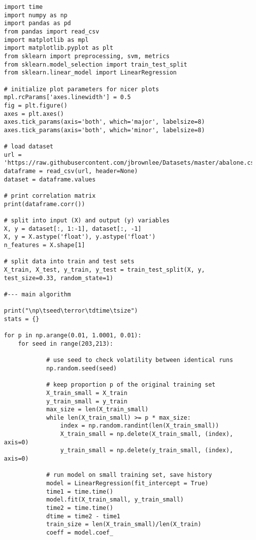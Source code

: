 \documentclass[oneside,10pt]{book}
\begin{document}
\begin{lstlisting}
import time
import numpy as np
import pandas as pd
from pandas import read_csv
import matplotlib as mpl
import matplotlib.pyplot as plt
from sklearn import preprocessing, svm, metrics
from sklearn.model_selection import train_test_split
from sklearn.linear_model import LinearRegression

# initialize plot parameters for nicer plots
mpl.rcParams['axes.linewidth'] = 0.5
fig = plt.figure()
axes = plt.axes()
axes.tick_params(axis='both', which='major', labelsize=8)
axes.tick_params(axis='both', which='minor', labelsize=8)

# load dataset
url = 'https://raw.githubusercontent.com/jbrownlee/Datasets/master/abalone.csv'
dataframe = read_csv(url, header=None)
dataset = dataframe.values

# print correlation matrix
print(dataframe.corr())

# split into input (X) and output (y) variables
X, y = dataset[:, 1:-1], dataset[:, -1]
X, y = X.astype('float'), y.astype('float')
n_features = X.shape[1]

# split data into train and test sets
X_train, X_test, y_train, y_test = train_test_split(X, y, test_size=0.33, random_state=1)

#--- main algorithm

print("\np\tseed\terror\tdtime\tsize")
stats = {}

for p in np.arange(0.01, 1.0001, 0.01):
    for seed in range(203,213):

            # use seed to check volatility between identical runs
            np.random.seed(seed)

            # keep proportion p of the original training set
            X_train_small = X_train
            y_train_small = y_train
            max_size = len(X_train_small)
            while len(X_train_small) >= p * max_size:
                index = np.random.randint(len(X_train_small))
                X_train_small = np.delete(X_train_small, (index), axis=0)
                y_train_small = np.delete(y_train_small, (index), axis=0)

            # run model on small training set, save history
            model = LinearRegression(fit_intercept = True)
            time1 = time.time()
            model.fit(X_train_small, y_train_small)
            time2 = time.time()
            dtime = time2 - time1
            train_size = len(X_train_small)/len(X_train)
            coeff = model.coef_


\end{lstlisting}
\end{document}
